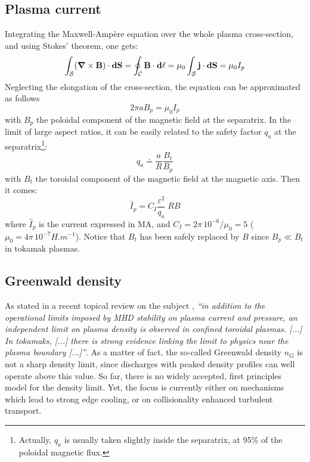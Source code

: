 \subsection{Plasma current}
Integrating the Maxwell-Amp\`ere equation over the whole plasma cross-section, and using Stokes' theorem, one gets:
\begin{equation*}
\int_\mathcal{S} (\mbox{\boldmath${\nabla}$}\times {\mathbf B}) \cdot \mathbf{dS} = 
\oint_\mathcal{C} \mathbf{B} \cdot \mathbf{d\ell}
= \mu_0 \int_\mathcal{S} {\mathbf j} \cdot \mathbf{dS} = \mu_0 I_p
\end{equation*}
Neglecting the elongation of the cross-section, the equation can be approximated as follows
$$
2\pi a B_p = \mu_0 I_p
$$
with $B_p$ the poloidal component of the magnetic field at the separatrix. In the limit of large aspect ratios, it can be easily related to the safety factor $q_a$ at the separatrix\footnote{Actually, $q_a$ is usually taken slightly inside the separatrix, at 95$\%$ of the poloidal magnetic flux.}:
\begin{equation*}
q_a \doteq \frac{a}{R} \frac{B_t}{B_p} 
\end{equation*}
with $B_t$ the toroidal component of the magnetic field at the magnetic axis. Then it comes:
\begin{equation}
\boxed{\hat I_p = C_I \frac{\varepsilon^2}{q_a} \; R B}
\label{eqn:plasma_current}
\end{equation}
where $\hat I_p$ is the current expressed in MA, and $C_I = 2\pi\, 10^{-6} /\mu_0 = 5$  ($\mu_0 = 4\pi\, 10^{-7} \si{H.m^{-1}}$).
Notice that $B_t$ has been safely replaced by $B$ since $B_p\ll B_t$ in tokamak plasmas. 

\subsection{Greenwald density}

As stated in a recent topical review on the subject \cite{Greenwald2002}, \emph{``in addition to the operational limits imposed by MHD stability on plasma current and pressure, an independent limit on plasma density is observed in confined toroidal plasmas. [...] In tokamaks, [...] there is strong evidence linking the limit to physics near the plasma boundary [...]''}. As a matter of fact, the so-called Greenwald density $n_G$ is not a sharp density limit, since discharges with peaked density profiles can well operate above this value. So far, there is no widely accepted, first principles model for the density limit. Yet, the focus is currently either on mechanisms which lead to strong edge cooling, or on collisionality enhanced turbulent transport.

